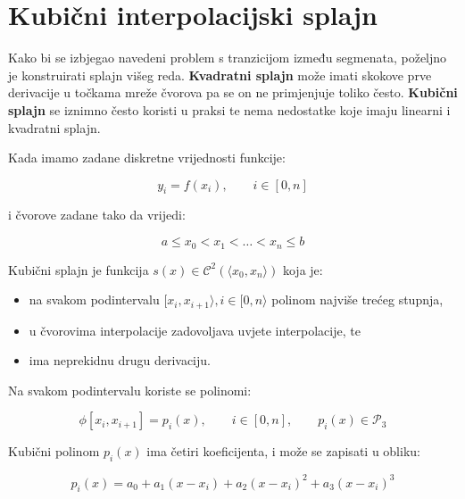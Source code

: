 
\section{Kubični interpolacijski splajn}

Kako bi se izbjegao navedeni problem s tranzicijom između segmenata, poželjno je konstruirati splajn višeg reda.
\textbf{Kvadratni splajn} može imati skokove prve derivacije u točkama mreže čvorova pa se on ne primjenjuje toliko često.
\textbf{Kubični splajn} se iznimno često koristi u praksi te nema nedostatke koje imaju linearni i kvadratni splajn.

Kada imamo zadane diskretne vrijednosti funkcije:

\begin{equation*}
y_i=f(x_i),\qquad i\in[0,n]
\end{equation*}

i čvorove zadane tako da vrijedi:

$$
a\leq x_0 < x_1 < \dots < x_n \leq b
$$

Kubični splajn je funkcija $s(x)\in\mathcal{C}^2(\langle x_0,x_n\rangle)$ koja je:

\begin{itemize}
    \item na svakom podintervalu $[x_i, x_{i+1}\rangle, i\in[0,n\rangle$ polinom najviše trećeg stupnja,
    \item u čvorovima interpolacije zadovoljava uvjete interpolacije, te
    \item ima neprekidnu drugu derivaciju.
\end{itemize}

Na svakom podintervalu koriste se polinomi:

\begin{equation*}
\phi[x_i,x_{i+1}] = p_i(x),\qquad i\in[0,n],\qquad p_i(x)\in\mathcal{P}_3
\end{equation*}

Kubični polinom $p_i(x)$ ima četiri koeficijenta, i može se zapisati u obliku:

$$
p_i(x)=a_0+a_1(x-x_i)+a_2(x-x_i)^2+a_3(x-x_i)^3
$$

